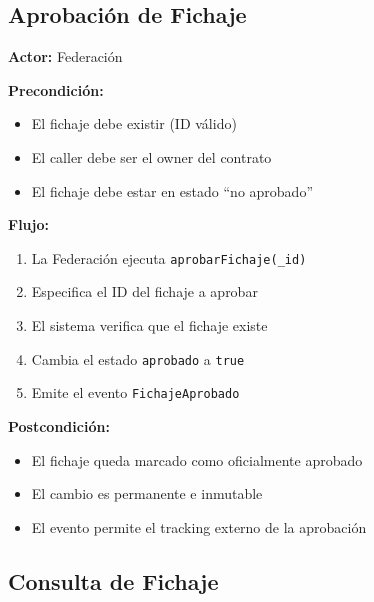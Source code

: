 \documentclass[12pt,a4paper]{article}
\begin{document}
	\subsection{Aprobación de Fichaje}
	
	\begin{tcolorbox}[title=Aprobación de Fichaje,colback=green!5!white]
		\textbf{Actor:} Federación
		
		\textbf{Precondición:}
		\begin{itemize}
			\item El fichaje debe existir (ID válido)
			\item El caller debe ser el owner del contrato
			\item El fichaje debe estar en estado ``no aprobado''
		\end{itemize}
		
		\textbf{Flujo:}
		\begin{enumerate}
			\item La Federación ejecuta \texttt{aprobarFichaje(\_id)}
			\item Especifica el ID del fichaje a aprobar
			\item El sistema verifica que el fichaje existe
			\item Cambia el estado \texttt{aprobado} a \texttt{true}
			\item Emite el evento \texttt{FichajeAprobado}
		\end{enumerate}
		
		\textbf{Postcondición:}
		\begin{itemize}
			\item El fichaje queda marcado como oficialmente aprobado
			\item El cambio es permanente e inmutable
			\item El evento permite el tracking externo de la aprobación
		\end{itemize}
	\end{tcolorbox}
	
	\subsection{Consulta de Fichaje}
	
\end{document}
